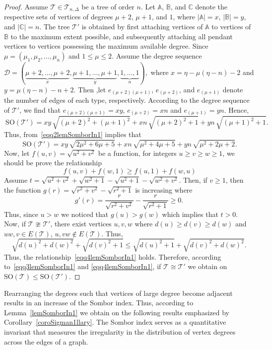 \documentclass[12pt, a4paper]{article}
\newcommand{\TT}{\mathcal{T}}
\begin{document}
\begin{proof}
Assume  $\TT\in \TT_{n,\Delta}$ be a tree of order $n$. Let $\mathbb{A}$, $\mathbb{B}$, and $\mathbb{C}$ denote the respective sets of vertices of degrees $\mu+2$, $\mu+1$, and $1$, where $|\mathbb{A}|=x$, $|\mathbb{B}|=y$, and $|\mathbb{C}|=n$. The tree $\TT'$ is obtained by first attaching vertices of $\mathbb{A}$ to vertices of $\mathbb{B}$ to the maximum extent possible, and subsequently attaching all pendant vertices to vertices possessing the maximum available degree.  Since  $\mu=(\mu_1,\mu_2,\dots,\mu_n)$ and $1\leqslant \mu \leqslant 2$. Assume the degree sequence $\mathscr{D}=(\underbrace{\mu+2,\dots,\mu+2}_{x},
 \underbrace{\mu+1,\dots,\mu+1}_{y},
 \underbrace{1,\dots,1}_{n}),$
where $x=\eta-\mu(\eta-n)-2$ and $y=\mu(\eta-n)-n+2$. Then ,let $e_{(\mu+2)(\mu+1)}$, $e_{(\mu+2)}$, and $e_{(\mu+1)}$ denote the number of
edges of each type, respectively. According to the degree sequence of $\TT'$, we find that $e_{(\mu+2)(\mu+1)}=xy$, $e_{(\mu+2)}=xn$ and  $e_{(\mu+1)}=yn$. Hence, 
\begin{equation}~\label{eqq2lemSomborIn1}
\mathrm{SO}(\TT')=xy\,\sqrt{(\mu+2)^2+(\mu+1)^2}+xn\,\sqrt{(\mu+2)^2+1}+yn\,\sqrt{(\mu+1)^2+1}.
\end{equation}
Thus, from~\eqref{eqq2lemSomborIn1} implies that 
\begin{equation}~\label{eqq3lemSomborIn1}
\mathrm{SO}(\TT')=xy\,\sqrt{2\mu^2+6\mu+5}+xn\,\sqrt{\mu^2+4\mu+5}+yn\,\sqrt{\mu^2+2\mu+2}.
\end{equation}
Now, let $f(u,v)=\sqrt{u^2+v^2}$ be a function, for integers $u\geqslant v\geqslant w\geqslant 1$, we should be prove the relationship
\begin{equation}~\label{eqq4lemSomborIn1}
f(u,v)+f(w,1)\geqslant f(u,1)+f(w,u)
\end{equation}
Assume $t=\sqrt{u^2+v^2}+\sqrt{w^2+1}-\sqrt{u^2+1}-\sqrt{w^2+v^2}$. Then, if $v\geqslant 1$, then the function $g(r)=\sqrt{r^2+v^2}-\sqrt{r^2+1}$ is increasing where 
\[
g'(r)=\frac{r}{\sqrt{r^2+v^2}}-\frac{r}{\sqrt{r^2+1}} \geqslant 0.
\]
Thus, since $u>w$ we noticed that $g(u)>g(w)$ which implies that $t>0$. Now, if $\TT\ncong \TT'$, there exist vertices $u,v,w$ where $d(u)\geqslant d(v)\geqslant d(w)$ and $uw,v\in E(\TT)$, $u,vw\notin E(\TT)$. Thus, 
\[
\sqrt{d(u)^2+d(w)^2}+\sqrt{d(v)^2+1}\leqslant \sqrt{d(u)^2+1}+\sqrt{d(v)^2+d(w)^2}.
\]
Thus, the relationship~\eqref{eqq4lemSomborIn1} holds. Therefore, according to~\eqref{eqq3lemSomborIn1} and \eqref{eqq4lemSomborIn1}, if $\TT \cong \TT'$ we obtain on $\mathrm{SO}(\TT)\leqslant \mathrm{SO}(\TT')$.
\end{proof}
Rearranging the degrees such that vertices of large degree become adjacent results in an increase of the Sombor index. Thus, according to Lemma~\ref{lemSomborIn1} we obtain on the following results emphasized by Corollary~\ref{coroSigman1llary}. The Sombor index serves as a quantitative invariant that measures the irregularity in the distribution of vertex degrees across the edges of a graph.
\end{document}
